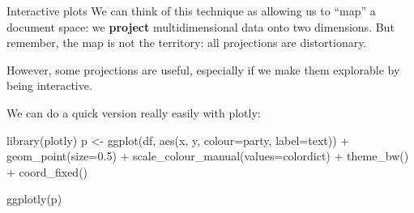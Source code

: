 \documentclass[
  10pt,
  ignorenonframetext,
  aspectratio=169]{beamer}
\newenvironment{Shaded}{\begin{snugshade}}{\end{snugshade}}
\newcommand{\AttributeTok}[1]{\textcolor[rgb]{0.80,0.80,0.80}{#1}}
\newcommand{\FloatTok}[1]{\textcolor[rgb]{0.75,0.75,0.82}{#1}}
\newcommand{\FunctionTok}[1]{\textcolor[rgb]{0.94,0.94,0.56}{#1}}
\newcommand{\NormalTok}[1]{\textcolor[rgb]{0.80,0.80,0.80}{#1}}
\newcommand{\OtherTok}[1]{\textcolor[rgb]{0.94,0.94,0.56}{#1}}
\newcommand{\SpecialCharTok}[1]{\textcolor[rgb]{0.86,0.64,0.64}{#1}}
\begin{document}
\begin{frame}[fragile]{Interactive plots}
\protect\hypertarget{interactive-plots}{}
We can think of this technique as allowing us to ``map'' a document
space: we \textbf{project} multidimensional data onto two dimensions.
But remember, the map is not the territory: all projections are
distortionary.

However, some projections are useful, especially if we make them
explorable by being interactive.

We can do a quick version really easily with plotly:

\scriptsize

\begin{Shaded}
\begin{Highlighting}[]
\FunctionTok{library}\NormalTok{(plotly)}
\NormalTok{p }\OtherTok{\textless{}{-}} \FunctionTok{ggplot}\NormalTok{(df, }\FunctionTok{aes}\NormalTok{(x, y, }\AttributeTok{colour=}\NormalTok{party, }\AttributeTok{label=}\NormalTok{text)) }\SpecialCharTok{+} 
  \FunctionTok{geom\_point}\NormalTok{(}\AttributeTok{size=}\FloatTok{0.5}\NormalTok{) }\SpecialCharTok{+} 
  \FunctionTok{scale\_colour\_manual}\NormalTok{(}\AttributeTok{values=}\NormalTok{colordict) }\SpecialCharTok{+} 
  \FunctionTok{theme\_bw}\NormalTok{() }\SpecialCharTok{+}
  \FunctionTok{coord\_fixed}\NormalTok{()}

\FunctionTok{ggplotly}\NormalTok{(p)}
\end{Highlighting}
\end{Shaded}
\end{frame}
\end{document}

